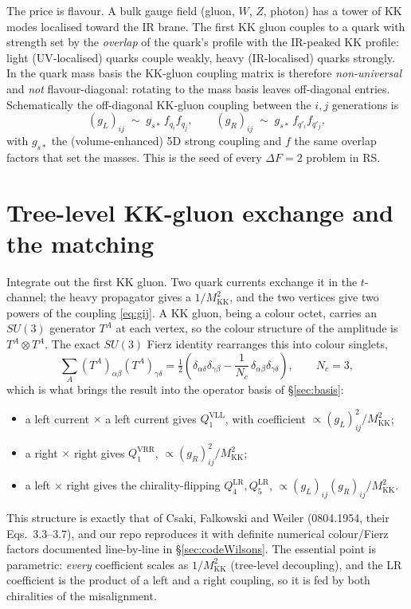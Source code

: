 \documentclass[11pt]{article}
\newcommand{\MKK}{M_{\mathrm{KK}}}
\newcommand{\half}{\tfrac{1}{2}}
\newcommand{\gss}{g_{s*}}
\newcommand{\Nc}{N_c}
\newcommand{\QVLL}{Q_1^{\mathrm{VLL}}}
\newcommand{\QVRR}{Q_1^{\mathrm{VRR}}}
\newcommand{\QLRfour}{Q_4^{\mathrm{LR}}}
\newcommand{\QLRfive}{Q_5^{\mathrm{LR}}}
\newcommand{\TA}{T^A}
\theoremstyle{definition}
\begin{document}
The price is flavour. A bulk gauge field (gluon, $W$, $Z$, photon) has a tower of
KK modes localised toward the IR brane. The first KK gluon couples to a quark with
strength set by the \emph{overlap} of the quark's profile with the IR-peaked KK
profile: light (UV-localised) quarks couple weakly, heavy (IR-localised) quarks
strongly. In the quark mass basis the KK-gluon coupling matrix is therefore
\emph{non-universal} and \emph{not} flavour-diagonal: rotating to the mass basis
leaves off-diagonal entries. Schematically the off-diagonal KK-gluon coupling
between the $i,j$ generations is
\begin{equation}
(g_{L})_{ij} \;\sim\; \gss\, f_{q_i} f_{q_j}, \qquad
(g_{R})_{ij} \;\sim\; \gss\, f_{q'_i} f_{q'_j},
\label{eq:gij}
\end{equation}
with $\gss$ the (volume-enhanced) 5D strong coupling and $f$ the same overlap
factors that set the masses. This is the seed of every $\Delta F=2$ problem in RS.

\section{Tree-level KK-gluon exchange and the matching}
\label{sec:treelevel}

Integrate out the first KK gluon. Two quark currents exchange it in the
$t$-channel; the heavy propagator gives a $1/\MKK^2$, and the two vertices give
two powers of the coupling \eqref{eq:gij}. A KK gluon, being a colour octet,
carries an $SU(3)$ generator $\TA$ at each vertex, so the colour structure of the
amplitude is $\TA\otimes\TA$. The exact $SU(3)$ Fierz identity rearranges this
into colour singlets,
\begin{equation}
\sum_A (\TA)_{\alpha\beta}(\TA)_{\gamma\delta}
= \half\left(\delta_{\alpha\delta}\delta_{\gamma\beta}
- \frac{1}{\Nc}\,\delta_{\alpha\beta}\delta_{\gamma\delta}\right),
\qquad \Nc=3,
\label{eq:fierz}
\end{equation}
which is what brings the result into the operator basis of \S\ref{sec:basis}:
\begin{itemize}[leftmargin=1.4em]
\item a left current $\times$ a left current gives $\QVLL$, with coefficient
$\propto (g_L)_{ij}^2/\MKK^2$;
\item a right $\times$ right gives $\QVRR$, $\propto (g_R)_{ij}^2/\MKK^2$;
\item a left $\times$ right gives the chirality-flipping $\QLRfour,\QLRfive$,
$\propto (g_L)_{ij}(g_R)_{ij}/\MKK^2$.
\end{itemize}
This structure is exactly that of Csaki, Falkowski and Weiler (0804.1954, their
Eqs.~3.3--3.7), and our repo reproduces it with definite numerical colour/Fierz
factors documented line-by-line in \S\ref{sec:codeWilsons}. The essential point is
parametric: \emph{every} coefficient scales as $1/\MKK^2$ (tree-level decoupling),
and the LR coefficient is the product of a left and a right coupling, so it is
fed by both chiralities of the misalignment.
\end{document}
